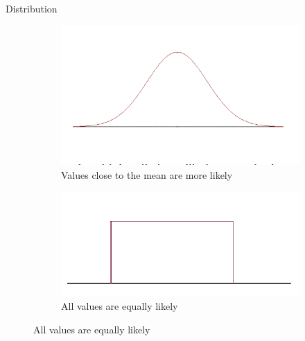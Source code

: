 \documentclass[10pt,dvipsnames, aspectratio=169]{beamer}
\begin{document}
\begin{frame}[t]{Distribution}
	\begin{figure}[h]
		\centering
		\begin{subfigure}{0.45\textwidth}
			\centering
			\includegraphics[trim={0 1cm 0 0}, clip, scale=0.4]{eda/nd.png}
			\caption{Values close to the mean are more likely}
		\end{subfigure}
		\hfil
		\begin{subfigure}{0.45\textwidth}
			\centering
			\includegraphics[scale=0.5]{eda/nd2.png}
			\caption{All values are equally likely}
		\end{subfigure}
		
	\end{figure}
\end{frame}
\end{document}
